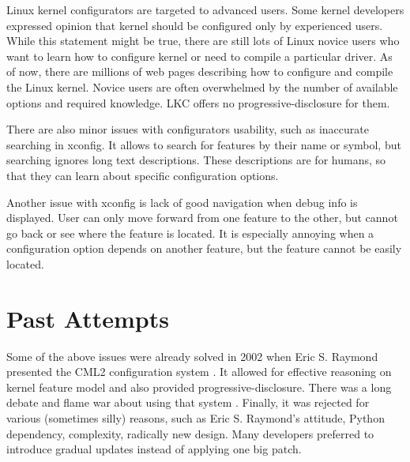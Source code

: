 \documentclass{chi2009}
\begin{document}
Linux kernel configurators are targeted to advanced users. Some kernel developers expressed opinion \cite{kernel:aunt:2002} that kernel should be configured only by experienced users. While this statement might be true, there are still lots of Linux novice users who want to learn how to configure kernel or need to compile a particular driver. As of now, there are millions of web pages describing how to configure and compile the Linux kernel. Novice users are often overwhelmed by the number of available options and required knowledge. LKC offers no progressive-disclosure for them.

There are also minor issues with configurators usability, such as inaccurate searching in xconfig. It allows to search for features by their name or symbol, but searching ignores long text descriptions. These descriptions are for humans, so that they can learn about specific configuration options.

Another issue with xconfig is lack of good navigation when debug info is displayed. User can only move forward from one feature to the other, but cannot go back or see where the feature is located. It is especially annoying when a configuration option depends on another feature, but the feature cannot be easily located.

\section{Past Attempts}
Some of the above issues were already solved in 2002 when Eric S. Raymond presented the CML2 configuration system \cite{raymond:cml2:2000}. It allowed for effective reasoning on kernel feature model and also provided progressive-disclosure. There was a long debate and flame war about using that system \cite{kerneltrap:linux:2002}. Finally, it was rejected for various (sometimes silly) reasons, such as Eric S. Raymond's attitude, Python dependency, complexity, radically new design. Many developers preferred to introduce gradual updates instead of applying one big patch.
\end{document}
